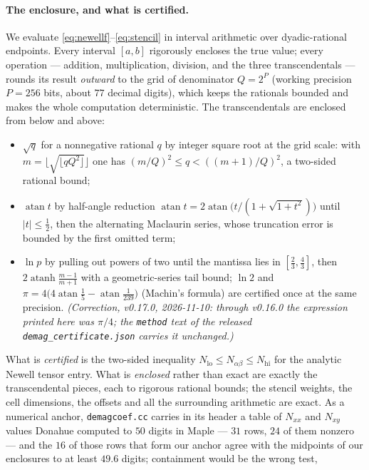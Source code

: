 \documentclass[11pt]{amsart}
\DeclareMathOperator{\atan}{atan}
\theoremstyle{plain}
\theoremstyle{definition}
\theoremstyle{remark}
\begin{document}
\paragraph{The enclosure, and what is certified.}
We evaluate \eqref{eq:newellf}--\eqref{eq:stencil} in interval arithmetic over
dyadic-rational endpoints. Every interval $[a,b]$ rigorously encloses the true
value; every operation --- addition, multiplication, division, and the three
transcendentals --- rounds its result \emph{outward} to the grid of denominator
$Q=2^{P}$ (working precision $P=256$ bits, about $77$ decimal digits), which
keeps the rationals bounded and makes the whole computation deterministic. The
transcendentals are enclosed from below and above:
\begin{itemize}
  \item $\sqrt q$ for a nonnegative rational $q$ by integer square root at the
  grid scale: with $m=\lfloor\sqrt{\lfloor qQ^2\rfloor}\rfloor$ one has
  $(m/Q)^2\le q<((m{+}1)/Q)^2$, a two-sided rational bound;
  \item $\atan t$ by half-angle reduction $\atan t = 2\atan\!\big(t/(1+\sqrt{1+t^2})\big)$
  until $|t|\le\tfrac12$, then the alternating Maclaurin series, whose truncation
  error is bounded by the first omitted term;
  \item $\ln p$ by pulling out powers of two until the mantissa lies in
  $[\tfrac23,\tfrac43]$, then $2\operatorname{atanh}\frac{m-1}{m+1}$ with a
  geometric-series tail bound; $\ln 2$ and
  $\pi=4\big(4\atan\tfrac15-\atan\tfrac1{239}\big)$ (Machin's formula) are
  certified once at the same precision. \emph{(Correction, v0.17.0, 2026-11-10:
  through v0.16.0 the expression printed here was $\pi/4$; the \texttt{method}
  text of the released \texttt{demag\_certificate.json} carries it unchanged.)}
\end{itemize}
What is \emph{certified} is the two-sided inequality $N_{\mathrm{lo}}\le
N_{\alpha\beta}\le N_{\mathrm{hi}}$ for the analytic Newell tensor entry. What is
\emph{enclosed} rather than exact are exactly the transcendental pieces, each to
rigorous rational bounds; the stencil weights, the cell dimensions, the offsets
and all the surrounding arithmetic are exact. As a numerical anchor,
\texttt{demagcoef.cc} carries in its header a table of $N_{xx}$ and $N_{xy}$
values Donahue computed to $50$ digits in Maple --- $31$ rows, $24$ of them
nonzero --- and the $16$ of those rows that form our anchor agree with the
midpoints of our enclosures to at least $49.6$ digits; containment would be the
wrong test,
\end{document}
